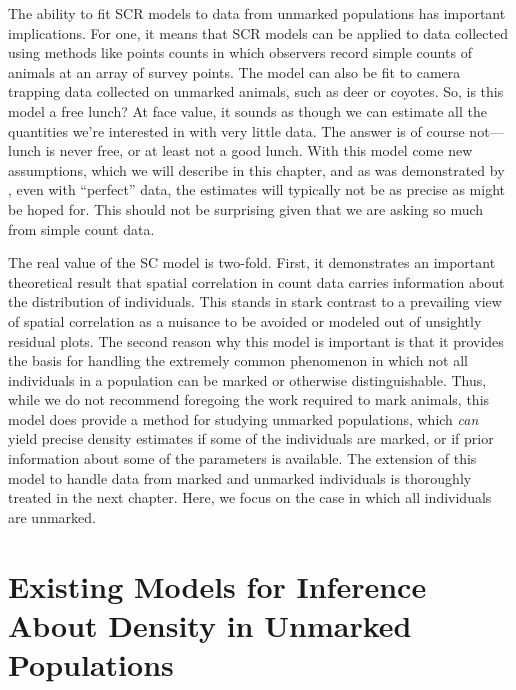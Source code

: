 The ability to fit SCR models to data from unmarked populations has
important implications. For one, it means that SCR models can
be applied to data collected using methods like points counts in which
observers record simple counts of animals at an array of survey
points. The model can also be fit to camera trapping data collected on
unmarked animals, such as deer or coyotes.
So, is this model a free lunch? At face value, it sounds as though we
can estimate all the quantities we're interested in with very little
data. The answer is of course not---lunch is never free, or at least
not a good lunch. With this model come new assumptions, which we will
describe in this chapter, and as was demonstrated by
\citet{chandler_royle:2012}, even with ``perfect'' data, the estimates
will typically not be as precise as might be hoped for. This should
not be surprising given that we are asking so much from simple count
data.

The real value of the SC model is two-fold. First, it demonstrates
an important theoretical result %
that spatial correlation in
count data carries information about the distribution of
individuals. This stands in stark contrast to a prevailing view of
spatial correlation as a nuisance to be avoided or modeled out of unsightly
residual plots. The second reason why this model is important is that
it provides the basis for handling the extremely common phenomenon in
which not all individuals in a population can be marked or otherwise
distinguishable. Thus, while we do not recommend foregoing the work
required to mark animals, this model does provide a method for
studying unmarked populations, which \textit{can} yield precise
density estimates if some of the individuals are marked, or if prior
information about some of the parameters is available.
The extension of this model to handle data from marked and unmarked
individuals is thoroughly treated in the next chapter. Here, we focus
on the case in which all individuals are unmarked.

\section{Existing Models for Inference About Density in Unmarked Populations}
\label{Sect.existing-unmarked}


